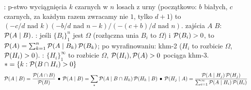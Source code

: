 :  p-stwo wyciągnięcia $k$ czarnych w $n$ losach z urny (początkowo: $b$ białych, $c$ czarnych, za każdym razem zwracamy nie $1$, tylko $d + 1$) to $(-c/d \mbox{ nad } k)(-b/d \mbox{ nad } n-k)/(-(c + b)/d \mbox{ nad } n)$.
 zajścia $A$  $B$: $\operatorname{\mathcal{P}} (A \mid B)$.
: jeśli $\{B_i\}_1^n$ jest  $\Omega$ (rozłączna unia $B_i$ to $\Omega$) i $\operatorname{\mathcal{P}} (B_i) > 0$, to $\operatorname{\mathcal{P}} (A) = \sum_{k=1}^n \operatorname{\mathcal{P}} (A \mid B_k) \operatorname{\mathcal{P}} (B_k)$; po wyrafinowaniu: khm-2 ($H_i$ to rozbicie $\Omega$, $\operatorname{\mathcal{P}}(H_i) > 0$).
: $\{H_i\}_1^\infty$ to rozbicie $\Omega$, $\operatorname{\mathcal{P}} (H_i), \operatorname{\mathcal{P}} (A) > 0$ pociąga khm-3.
\hfill $* = \{k : \operatorname{\mathcal{P}} (B\cap H_i) > 0\}$
\[
	\operatorname{\mathcal{P}}(A \mid B) = \frac{\operatorname{\mathcal{P}} (A \cap B)}{\operatorname{\mathcal{P}} (B)} \, \bullet \,
	\operatorname{\mathcal{P}}(A \mid B) = \sum_* \operatorname{\mathcal{P}} (A \mid B \cap H_k) \operatorname{\mathcal{P}} (H_k \mid B) \, \bullet \,
	\operatorname{\mathcal{P}}(H_j \mid A) = \frac{\operatorname{\mathcal{P}} (A \mid H_j) \operatorname{\mathcal{P}} (H_j)}{\sum_{i=1}^\infty \operatorname{\mathcal{P}} (A\mid H_i) \operatorname{\mathcal{P}}(H_i)} 
\]